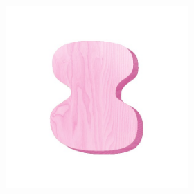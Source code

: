 \begin{figure}[h!]
\begin{center}
\begin{subfigure}[b]{0.15\textwidth}
\begin{center}
\begin{subfigure}[b]{0.9\textwidth}
                \end{subfigure}
            \end{center}
        \end{subfigure}
        \begin{subfigure}[b]{0.15\textwidth}
            \begin{center}
                \begin{subfigure}[b]{0.9\textwidth}
                    \includegraphics[width=\linewidth]{figures/artist_objects/fake5_wood_pink.jpg}
                \end{subfigure}
                \begin{subfigure}[b]{0.9\textwidth}

\end{subfigure}
\end{center}
\end{subfigure}
\end{center}
\end{figure}
